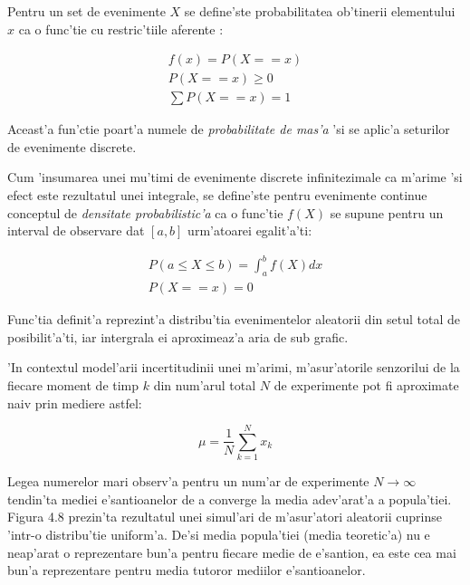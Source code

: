 \documentclass[12pt,a4paper,twoside]{report}
\begin{document}
Pentru un set de evenimente $X$ se define'ste probabilitatea ob'tinerii elementului $x$ ca o func'tie cu restric'tiile aferente \cite{probability}:


\begin{gather}
    f(x) = P(X == x) \\
    P(X == x) \geq 0 \\
    \sum P(X == x) = 1
\end{gather}

Aceast'a fun'ctie poart'a numele de \textit{probabilitate de mas'a} 'si se aplic'a seturilor de evenimente discrete.

\vspace{5px}

Cum 'insumarea unei mu'timi de evenimente discrete infinitezimale ca m'arime 'si efect este rezultatul unei integrale, se define'ste pentru evenimente continue conceptul de \textit{densitate probabilistic'a} ca o func'tie $f(X)$ se supune pentru un interval de observare dat $[a,b]$ urm'atoarei egalit'a'ti:


\begin{gather}
    P(a \leq X \leq b) = \int_{a}^{b} f(X) dx \\ 
    P(X == x) = 0 
\end{gather}

Func'tia definit'a reprezint'a distribu'tia evenimentelor aleatorii din setul total de posibilit'a'ti, iar intergrala ei aproximeaz'a aria de sub grafic.

\vspace{5px}

'In contextul model'arii incertitudinii unei m'arimi, m'asur'atorile senzorilui de la fiecare moment de timp $k$ din num'arul total $N$ de experimente pot fi aproximate naiv prin mediere astfel: 

\begin{equation}
     \mu={\frac {1}{N}}\sum _{k=1}^{N}x_{k}
\end{equation}

\vspace{5px}

Legea numerelor mari \cite{LLN} observ'a pentru un num'ar de experimente $N \to \infty$ tendin'ta mediei e'santioanelor de a converge la media adev'arat'a a popula'tiei. Figura 4.8 prezin'ta rezultatul unei simul'ari de m'asur'atori aleatorii cuprinse 'intr-o distribu'tie uniform'a. De'si media popula'tiei (media teoretic'a) nu e neap'arat o reprezentare bun'a pentru fiecare medie de e'santion, ea este cea mai bun'a reprezentare pentru media tutoror mediilor e'santioanelor.
\end{document}
